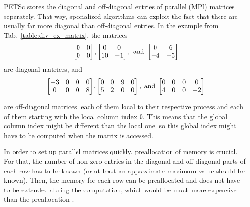 PETSc stores the diagonal and off-diagonal entries  of parallel (MPI) matrices separately. That way, specialized algorithms can exploit the fact that there are usually far more diagonal than off-diagonal entries.  In the example from Tab.~\ref{table:div_ex_matrix}, the matrices
\begin{align}
\begin{bmatrix}
0 & 0\\
0 & 0\\
\end{bmatrix},
\begin{bmatrix}
0 & 0\\
10 & -1\\
\end{bmatrix}, \textnormal{ and }
\begin{bmatrix}
0 & 6\\
-4 & -5\\
\end{bmatrix}
\label{mat:diag_example}
\end{align}
are diagonal matrices, and 
\begin{align}
\begin{bmatrix}
-3 & 0 & 0 & 0\\
0 & 0 & 0 & 8\\
\end{bmatrix},
\begin{bmatrix}
0 & 0 & 9 & 0\\
5 & 2 & 0 & 0\\
\end{bmatrix}, \textnormal{ and }
\begin{bmatrix}
0 & 0 & 0 & 0\\
4 & 0 & 0 & -2\\
\end{bmatrix}
\label{mat:diag_example}
\end{align}

are off-diagonal matrices, each of them local to their respective process and each of them starting with the local column index 0. This means that the global column index might be different than the local one, so this global index might have to be computed when the matrix is accessed.

In order to set up parallel matrices quickly, preallocation of memory is crucial. For that, the number of non-zero entries in the diagonal and off-diagonal parts of each row has to be known (or at least an approximate maximum value should be known). Then, the memory for each row can be preallocated and does not have to be extended during the computation, which would be much more expensive than the preallocation \cite{petsc-web-page}.



